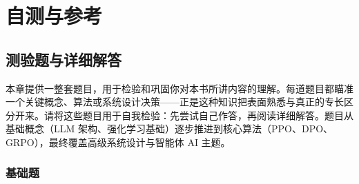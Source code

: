 \part{自测与参考}

\chapter{测验题与详细解答}
\label{quiz-questions-detailed-answers}

本章提供一整套题目，用于检验和巩固你对本书所讲内容的理解。每道题目都瞄准一个关键概念、算法或系统设计决策——正是这种知识把表面熟悉与真正的专长区分开来。请将这些题目用于自我检验：先尝试自己作答，再阅读详细解答。题目从基础概念（LLM 架构、强化学习基础）逐步推进到核心算法（PPO、DPO、GRPO），最终覆盖高级系统设计与智能体 AI 主题。

\section{基础题}
\label{foundations-questions}

